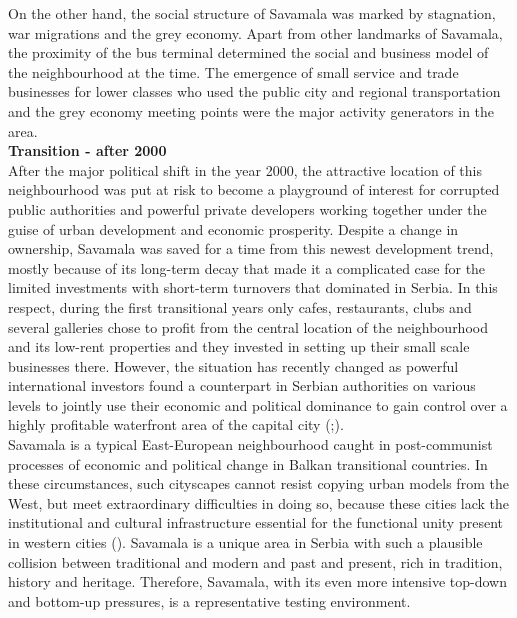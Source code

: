 \documentclass[11pt]{report}
\begin{document}
On the other hand, the social structure of Savamala was marked by stagnation, war migrations and the grey economy. Apart from other landmarks of Savamala, the proximity of the bus terminal determined the social and business model of the neighbourhood at the time. The emergence of small service and trade businesses for lower classes who used the public city and regional transportation and the grey economy meeting points were the major activity generators in the area.
\\
\textbf{Transition - after 2000}
\\
After the major political shift in the year 2000, the attractive location of this neighbourhood was put at risk to become a playground of interest for corrupted public authorities and powerful private developers working together under the guise of urban development and economic prosperity.  Despite a change in ownership, Savamala was saved for a time from this newest development trend, mostly because of its long-term decay that made it a complicated case for the limited investments with short-term turnovers that dominated in Serbia. In this respect, during the first transitional years only cafes, restaurants, clubs and several galleries chose to profit from the central location of the neighbourhood and its low-rent properties and they invested in setting up their small scale businesses there.   However,  the situation has recently changed as powerful international investors found a counterpart in Serbian authorities on various levels to jointly use their economic and political dominance to gain control over a highly profitable waterfront area of the capital city (\href{Zekovic}{\citealt{zekovic_spatial_2015}};\href{Zekovic}{\citealt{zekovic_megaprojects_2016}}).
\\

Savamala is a typical East-European neighbourhood caught in post-communist processes of economic and political change in Balkan transitional countries.
In these circumstances, such cityscapes cannot resist copying urban models from the West, but meet extraordinary difficulties in doing so, because these cities lack the institutional and cultural infrastructure essential for the functional unity present in western cities (\href{Petrovic}{\citealt{petrovic_cities_2009}}).
Savamala is a unique area in Serbia with such a plausible collision between traditional and modern and past and present, rich in tradition, history and heritage. Therefore, Savamala, with its even more intensive top-down and bottom-up pressures, is a representative testing environment.
\end{document}
